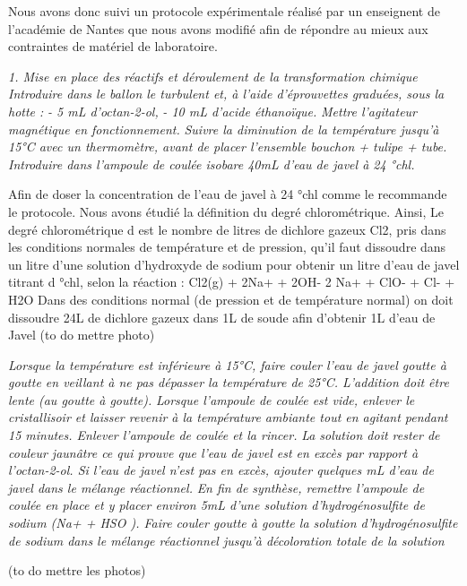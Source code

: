 Nous avons donc suivi un protocole expérimentale réalisé par un
enseignent de l'académie de Nantes que nous avons modifié afin de
répondre au mieux aux contraintes de matériel de laboratoire.

\emph{1. Mise en place des réactifs et déroulement de la transformation
chimique} \emph{Introduire dans le ballon le turbulent et, à l'aide
d'éprouvettes graduées, sous la hotte :} \emph{- 5 mL d'octan-2-ol,}
\emph{- 10 mL d'acide éthanoïque.} \emph{Mettre l'agitateur magnétique
en fonctionnement.} \emph{Suivre la diminution de la température jusqu'à
15°C avec un thermomètre, avant de placer l'ensemble bouchon + tulipe +
tube.} \emph{Introduire dans l'ampoule de coulée isobare 40mL d'eau de
javel à 24 °chl.}

Afin de doser la concentration de l'eau de javel à 24 °chl comme le
recommande le protocole. Nous avons étudié la définition du degré
chlorométrique. Ainsi, Le degré chlorométrique d est le nombre de litres
de dichlore gazeux Cl2, pris dans les conditions normales de température
et de pression, qu'il faut dissoudre dans un litre d'une solution
d'hydroxyde de sodium pour obtenir un litre d'eau de javel titrant d
°chl, selon la réaction : Cl2(g) + 2Na+ + 2OH- 2 Na+ + ClO- + Cl- + H2O
Dans des conditions normal (de pression et de température normal) on
doit dissoudre 24L de dichlore gazeux dans 1L de soude afin d'obtenir 1L
d'eau de Javel (to do mettre photo)

\emph{Lorsque la température est inférieure à 15°C, faire couler l'eau
de javel goutte à goutte en veillant à ne pas dépasser la température de
25°C. L'addition doit être lente (au goutte à goutte). } \emph{Lorsque
l'ampoule de coulée est vide, enlever le cristallisoir et laisser
revenir à la température ambiante tout en agitant pendant 15 minutes.
Enlever l'ampoule de coulée et la rincer.} \emph{La solution doit rester
de couleur jaunâtre ce qui prouve que l'eau de javel est en excès par
rapport à l'octan-2-ol. Si l'eau de javel n'est pas en excès, ajouter
quelques mL d'eau de javel dans le mélange réactionnel.} \emph{En fin de
synthèse, remettre l'ampoule de coulée en place et y placer environ 5mL
d'une solution d'hydrogénosulfite de sodium (Na+ + HSO ). Faire couler
goutte à goutte la solution d'hydrogénosulfite de sodium dans le mélange
réactionnel jusqu'à décoloration totale de la solution}

(to do mettre les photos)

